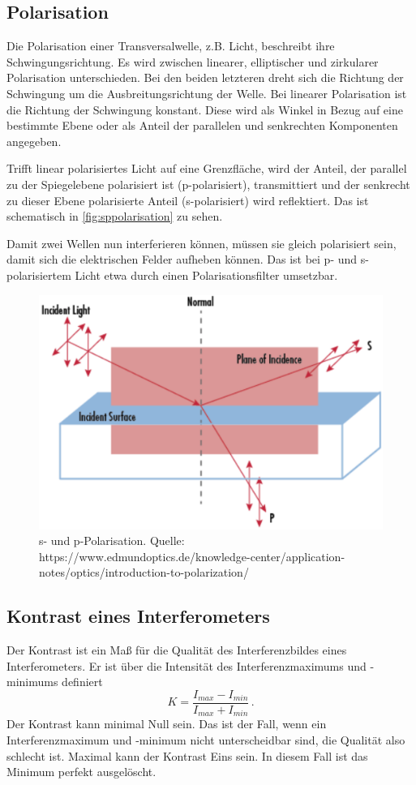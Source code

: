 \subsection{Polarisation}
Die Polarisation einer Transversalwelle, z.B. Licht, beschreibt ihre Schwingungsrichtung. Es wird zwischen linearer, elliptischer und zirkularer Polarisation unterschieden. Bei den beiden letzteren dreht sich die Richtung der Schwingung um die Ausbreitungsrichtung der Welle. Bei linearer Polarisation ist die Richtung der Schwingung konstant. Diese wird als Winkel in Bezug auf eine bestimmte Ebene oder als Anteil der parallelen und senkrechten Komponenten angegeben.

Trifft linear polarisiertes Licht auf eine Grenzfläche, wird der Anteil, der parallel zu der Spiegelebene polarisiert ist (p-polarisiert), transmittiert und der senkrecht zu dieser Ebene polarisierte Anteil (s-polarisiert) wird reflektiert. Das ist schematisch in \autoref{fig:sppolarisation} zu sehen.

Damit zwei Wellen nun interferieren können, müssen sie gleich polarisiert sein, damit sich die elektrischen Felder aufheben können. Das ist bei p- und s-polarisiertem Licht etwa durch einen Polarisationsfilter umsetzbar.

\begin{figure}
    \centering
    \includegraphics[width=0.6\linewidth]{./figures/s_p_polarisation.png}
    \caption{s- und p-Polarisation. Quelle: https://www.edmundoptics.de/knowledge-center/application-notes/optics/introduction-to-polarization/}
    \label{fig:sppolarisation}
\end{figure}



\subsection{Kontrast eines Interferometers}
Der Kontrast ist ein Maß für die Qualität des Interferenzbildes eines Interferometers. Er ist über die Intensität des Interferenzmaximums und -minimums definiert
\begin{equation}
    K = \frac{I_{max}-I_{min}}{I_{max}+I_{min}} \, .
    \label{eq:kontrast}
\end{equation}
Der Kontrast kann minimal Null sein. Das ist der Fall, wenn ein Interferenzmaximum und -minimum nicht unterscheidbar sind, die Qualität also schlecht ist.
Maximal kann der Kontrast Eins sein. In diesem Fall ist das Minimum perfekt ausgelöscht.

